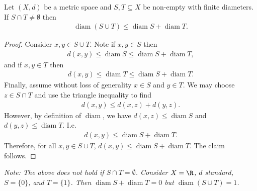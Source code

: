 \documentclass{article}
\DeclareMathOperator{\diam}{diam}
\begin{document}
\begin{claim*}[4]
   Let $(X,d)$ be a metric space and $S,T\subseteq X$ be non-empty with finite diameters.
   If $S\cap T\not=\emptyset$ then
   \begin{align}
      \diam(S\cup T) \leq \diam S + \diam T.
   \end{align}
   \begin{proof}
      Consider $x,y\in S\cup T$. Note if $x,y\in S$ then 
      \begin{align*}
         d(x,y) \leq \diam S \leq \diam S + \diam T,
      \end{align*}
      and if $x,y\in T$ then 
      \begin{align*}
         d(x,y) \leq \diam T \leq \diam S + \diam T.
      \end{align*}
      Finally, assume without loss of generality $x\in S$ and $y\in T$. We may choose
      $z\in S\cap T$ and use the triangle inequality to find 
      \begin{align*}
         d(x,y) \leq d(x,z) + d(y,z).
      \end{align*}
      However, by definition of $\diam$, we have $d(x,z) \leq \diam S$ and $d(y,z) \leq \diam T$.
      I.e. 
      \begin{align*}
         d(x,y) \leq \diam S + \diam T.
      \end{align*}
      Therefore, for all $x,y\in S\cup T$, $d(x,y) \leq \diam S + \diam T$. The claim follows.
   \end{proof}
\end{claim*}

\emph{Note: The above does not hold if $S\cap T=\emptyset$. Consider $X=\R$, $d$ standard,
$S=\{0\}$, and $T=\{1\}$. Then $\diam S + \diam T = 0$ but $\diam (S\cup T) = 1$.}
\end{document}
